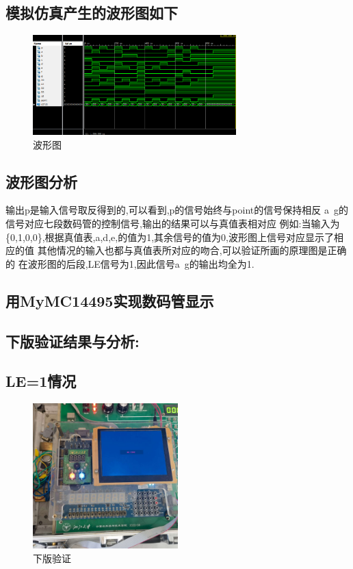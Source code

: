 \documentclass{article}
\begin{document}
\subsection*{模拟仿真产生的波形图如下}
    \begin{figure}[H]
	\centering
	\includegraphics[width=0.7\textwidth]{2.png}
	\caption{\label{Lab6}波形图}
	\end{figure}

\subsection*{波形图分析}
输出p是输入信号取反得到的,可以看到,p的信号始终与point的信号保持相反
a~g的信号对应七段数码管的控制信号,输出的结果可以与真值表相对应
例如:当输入为\{0,1,0,0\},根据真值表,a,d,e,的值为1,其余信号的值为0,波形图上信号对应显示了相应的值
其他情况的输入也都与真值表所对应的吻合,可以验证所画的原理图是正确的
在波形图的后段,LE信号为1,因此信号a~g的输出均全为1.

\subsection{用MyMC14495实现数码管显示}
\subsection*{下版验证结果与分析:}
\subsection*{LE=1情况}
    \begin{figure}[H]
	\centering
	\includegraphics[width=0.5\textwidth]{5.jpg}
	\caption{\label{Lab6}下版验证}
	\end{figure}
\end{document}
